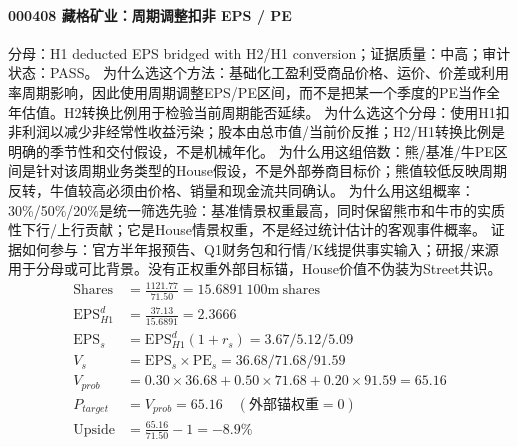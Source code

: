 \paragraph{000408 藏格矿业：周期调整扣非 EPS / PE}
分母：H1 deducted EPS bridged with H2/H1 conversion；证据质量：中高；审计状态：PASS。
为什么选这个方法：基础化工盈利受商品价格、运价、价差或利用率周期影响，因此使用周期调整EPS/PE区间，而不是把某一个季度的PE当作全年估值。H2转换比例用于检验当前周期能否延续。
为什么选这个分母：使用H1扣非利润以减少非经常性收益污染；股本由总市值/当前价反推；H2/H1转换比例是明确的季节性和交付假设，不是机械年化。
为什么用这组倍数：熊/基准/牛PE区间是针对该周期业务类型的House假设，不是外部券商目标价；熊值较低反映周期反转，牛值较高必须由价格、销量和现金流共同确认。
为什么用这组概率：30\%/50\%/20\%是统一筛选先验：基准情景权重最高，同时保留熊市和牛市的实质性下行/上行贡献；它是House情景权重，不是经过统计估计的客观事件概率。
证据如何参与：官方半年报预告、Q1财务包和行情/K线提供事实输入；研报/来源用于分母或可比背景。没有正权重外部目标锚，House价值不伪装为Street共识。
\begin{align*}
\mathrm{Shares} &= \frac{1121.77}{71.50}=15.6891\ \mathrm{100m\ shares}\\
\mathrm{EPS}_{H1}^d &= \frac{37.13}{15.6891}=2.3666\\
\mathrm{EPS}_s &= \mathrm{EPS}_{H1}^d(1+r_s)=3.67/5.12/5.09\\
V_s &= \mathrm{EPS}_s\times \mathrm{PE}_s=36.68/71.68/91.59\\
V_{prob} &= 0.30\times 36.68+0.50\times 71.68+0.20\times 91.59=65.16\\
P_{target} &= V_{prob}=65.16\quad(\text{外部锚权重}=0)\\
\mathrm{Upside} &= \frac{65.16}{71.50}-1=-8.9\%\\
\end{align*}

